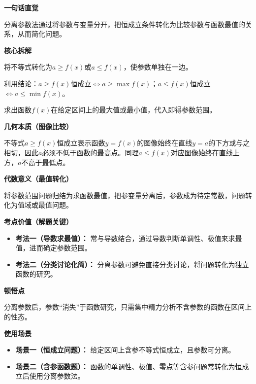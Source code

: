 \begin{explanationbox}

	\textbf{\textcolor{CExplanation}{一句话直觉}}

	分离参数法通过将参数与变量分开，把恒成立条件转化为比较参数与函数最值的关系，从而简化问题。

	\medskip
	\textbf{\textcolor{CExplanation}{核心拆解}}
	\begin{description}[style=nextline, leftmargin=2.8em, labelsep=0.5em, itemsep=0.45em]
		\item[\textbf{要点一（参数分离）：}] 将不等式转化为$a \ge f(x)$或$a \le f(x)$，使参数单独在一边。
		\item[\textbf{要点二（等价转化）：}] 利用结论：$a \ge f(x)$恒成立$\iff a \ge \max f(x)$；$a \le f(x)$恒成立$\iff a \le \min f(x)$。
		\item[\textbf{要点三（最值求解）：}] 求出函数$f(x)$在给定区间上的最大值或最小值，代入即得参数范围。
	\end{description}

	\medskip
	\textbf{\textcolor{CExplanation}{几何本质（图像比较）}}

	不等式$a \ge f(x)$恒成立表示函数$y=f(x)$的图像始终在直线$y=a$的下方或与之相切，因此$a$必须不低于函数的最高点。同理$a \le f(x)$对应图像始终在直线上方，$a$不高于最低点。

	\medskip
	\textbf{\textcolor{CExplanation}{代数意义（最值转化）}}

	将参数范围问题归结为求函数最值，把参变量分离后，参数成为待定常数，问题转化为值域或最值问题。

	\medskip
	\textbf{\textcolor{CExplanation}{考点价值（解题关键）}}
	\begin{itemize}[leftmargin=*, itemsep=0.5em, topsep=0.4em]
		\item \textbf{考法一（导数求最值）：} 常与导数结合，通过导数判断单调性、极值来求最值，进而确定参数范围。
		\item \textbf{考法二（分类讨论化简）：} 分离参数可避免直接分类讨论，将问题转化为独立函数的研究。
	\end{itemize}

	\medskip
	\textbf{\textcolor{CExplanation}{顿悟点}}

	分离参数后，参数“消失”于函数研究，只需集中精力分析不含参数的函数在区间上的性态。

	\medskip
	\textbf{\textcolor{CExplanation}{使用场景}}
	\begin{itemize}[leftmargin=*, itemsep=0.5em, topsep=0.4em]
		\item \textbf{场景一（恒成立问题）：} 给定区间上含参不等式恒成立，且参数可分离。
		\item \textbf{场景二（含参函数题）：} 函数的单调性、极值、零点等含参问题常转化为恒成立后使用分离参数法。
	\end{itemize}
\end{explanationbox}

